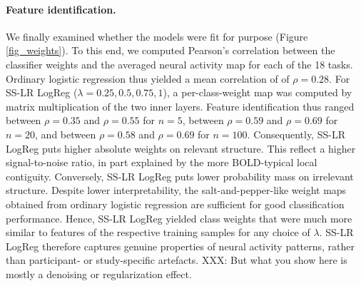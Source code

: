\documentclass{article} %
\begin{document}
\paragraph{Feature identification.}
We finally examined whether the models
were fit for purpose
(Figure \ref{fig_weights}).
%
To this end, we computed Pearson's correlation between the classifier weights
and the averaged neural activity map for each of the 18 tasks.
%
Ordinary logistic regression thus yielded a mean correlation of
of $\rho=0.28$.
%
For SS-LR LogReg ($\lambda=0.25, 0.5, 0.75, 1$),
a per-class-weight map was computed by matrix
multiplication of the two inner layers.
Feature identification thus ranged
between $\rho=0.35$ and $\rho=0.55$ for $n=5$,
between $\rho=0.59$ and $\rho=0.69$ for $n=20$, and
between $\rho=0.58$ and $\rho=0.69$ for $n=100$.
%
Consequently,
SS-LR LogReg puts higher absolute weights on relevant structure.
This reflect a higher signal-to-noise ratio, in part explained
by the more BOLD-typical local contiguity.
%
Conversely, SS-LR LogReg puts lower probability mass on irrelevant structure.
Despite lower interpretability, the
salt-and-pepper-like weight maps obtained from
ordinary logistic regression are sufficient for
good classification performance.
%
Hence, SS-LR LogReg yielded class weights 
that were much more similar to features of the respective training samples
for any choice of $\lambda$.
SS-LR LogReg therefore
captures genuine properties of neural activity patterns,
rather than participant- or study-specific artefacts.
XXX: But what you show here is mostly a denoising or regularization effect.
\end{document}

